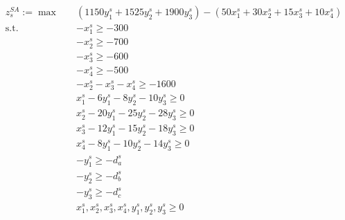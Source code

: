 \documentclass[7pt]{article}
\begin{document}
\begin{align*}
    z_s^{SA} := \max \quad
     & \left(1150y_1^s + 1525y_2^s + 1900 y_3^s \right)
    - \left(50 x_1^s + 30 x_2^s + 15 x_3^s + 10 x_4^s \right) \\
    \text{s.t.} \quad
     & -x_1^s \geq -300                                       \\
     & -x_2^s \geq -700                                       \\
     & -x_3^s \geq -600                                       \\
     & -x_4^s \geq -500                                       \\
     & -x_2^s - x_3^s - x_4^s \geq -1600                      \\
     & x_1^s - 6y_1^s - 8y_2^s - 10y_3^s \geq 0               \\
     & x_2^s - 20y_1^s - 25y_2^s - 28y_3^s \geq 0             \\
     & x_3^s - 12y_1^s - 15y_2^s - 18y_3^s \geq 0             \\
     & x_4^s - 8y_1^s - 10y_2^s - 14y_3^s \geq 0              \\
     & -y_1^s \geq -d_a^s                                     \\
     & -y_2^s \geq -d_b^s                                     \\
     & -y_3^s \geq -d_c^s                                     \\
     & x_1^s, x_2^s, x_3^s, x_4^s, y_1^s, y_2^s, y_3^s \geq 0
\end{align*}
\end{document}
